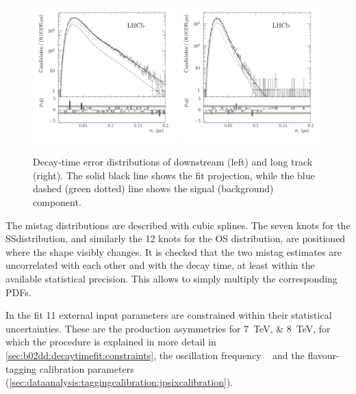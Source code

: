 \begin{figure}[htb]
\includegraphics[width=0.49\textwidth]{06-Bd2JpsiKS/tikz/pdf/obsTimeErr_downstream_pull_logy.pdf}
\includegraphics[width=0.49\textwidth]{06-Bd2JpsiKS/tikz/pdf/obsTimeErr_longtrack_pull_logy.pdf}
\caption{
Decay-time error distributions of downstream (left) and long track (right). The solid black line
shows the fit projection, while the blue dashed (green dotted) line shows the
signal (background) component.}
\label{fig:bd2jpsiks:nominalfit:time_error}
\end{figure}

The mistag distributions are described with cubic splines. The seven knots for
the SS\pion distribution, and similarly the 12 knots for the OS distribution,
are positioned where the shape visibly changes. It is checked that the two
mistag estimates are uncorrelated with each other and with the decay time, at
least within the available statistical precision. This allows to simply
multiply the corresponding PDFs.

In the fit 11 external input parameters are constrained within their
statistical uncertainties. These are the production asymmetries for
\SIlist{7;8}{\TeV}, for which the procedure is explained in more detail in
\cref{sec:b02dd:decaytimefit:constraints}, the oscillation frequency
\dmd~\cite{PDG2014} and the flavour-tagging calibration parameters
(\cref{sec:dataanalysis:taggingcalibration:jpsixcalibration}).

